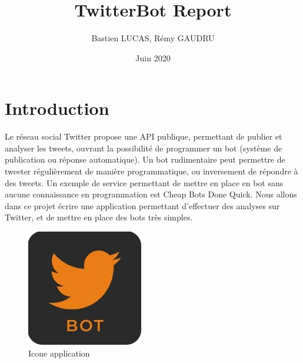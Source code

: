\documentclass{article}
\title{TwitterBot Report}
\author{Bastien LUCAS, Rémy GAUDRU}
\date{Juin 2020}
\begin{document}
\maketitle

\section{Introduction}
Le réseau social Twitter propose une API publique, permettant de publier et analyser les tweets, ouvrant la possibilité de programmer un bot (système de publication ou réponse automatique). 
\newline
\newline
Un bot rudimentaire peut permettre de tweeter régulièrement de manière programmatique, ou inversement de répondre à des tweets. Un exemple de service permettant de mettre en place en bot sans aucune connaissance en programmation est Cheap Bots Done Quick. Nous allons dans ce projet écrire une application permettant d’effectuer des analyses sur Twitter, et de mettre en place des bots très simples.

\begin{figure}[h!]
\centering
\includegraphics[scale=0.5]{images/icon.jpg}
\caption{Icone application}
\label{fig:Icone application}
\end{figure}
\end{document}
